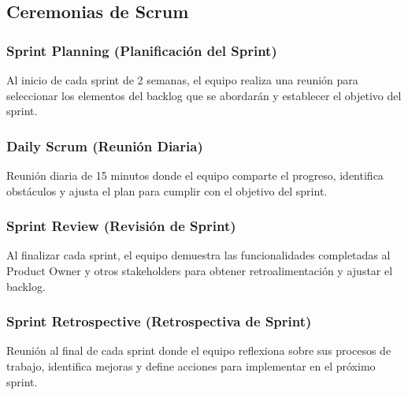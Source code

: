 \documentclass[conference]{IEEEtran}
\begin{document}
\subsection{Ceremonias de Scrum}
\subsubsection{Sprint Planning (Planificación del Sprint)} Al inicio de cada sprint de 2 semanas, el equipo realiza una reunión para seleccionar los elementos del backlog que se abordarán y establecer el objetivo del sprint.

\subsubsection{Daily Scrum (Reunión Diaria)} Reunión diaria de 15 minutos donde el equipo comparte el progreso, identifica obstáculos y ajusta el plan para cumplir con el objetivo del sprint.

\subsubsection{Sprint Review (Revisión de Sprint)} Al finalizar cada sprint, el equipo demuestra las funcionalidades completadas al Product Owner y otros stakeholders para obtener retroalimentación y ajustar el backlog.

\subsubsection{Sprint Retrospective (Retrospectiva de Sprint)} Reunión al final de cada sprint donde el equipo reflexiona sobre sus procesos de trabajo, identifica mejoras y define acciones para implementar en el próximo sprint.
\end{document}
